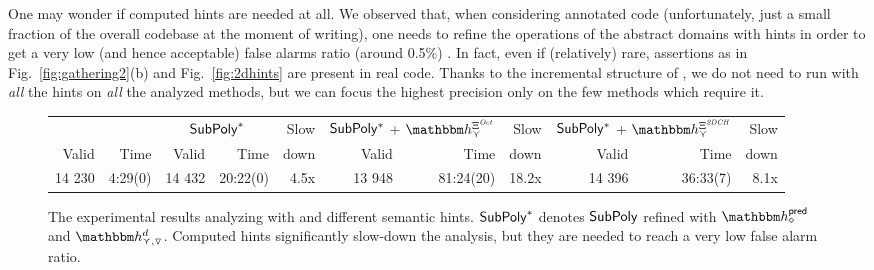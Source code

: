 \documentclass{llncs}
\newcommand{\sopra}{\vspace{-.3cm}}
\begin{document}
One may wonder if computed hints are needed at all.
We observed that, when considering annotated code (unfortunately, just a small fraction of the overall codebase at the moment of writing), one needs to refine the operations of the abstract domains with hints in order to get a very low (and hence acceptable) false alarms ratio (around 0.5\%) . 
In fact, even if (relatively) rare, assertions as in Fig.~\ref{fig:gathering2}(b) and Fig.~\ref{fig:2dhints} are present in real code.
Thanks to the incremental structure of \Clousot, we do not need to run \Subpoly{} with \emph{all} the hints on \emph{all} the analyzed methods, but we can focus the highest precision only on the few methods which require it.


\begin{figure}[t]
\centering
\small
\begin{tabular}{@{}r r | r r r| r r r | r r r@{}}
                        \multicolumn{2}{c|}{\Subpoly{}} & 
                        \multicolumn{2}{c}{$\mathsf{SubPoly}^*$}
                          & Slow &
                       \multicolumn{2}{c}{$\mathsf{SubPoly}{}^*$ + $ \hint{\cjoin}^{\hintcomp^\mathit{Oct}}$}
                          & Slow 
&  \multicolumn{2}{c}{$\mathsf{SubPoly}{}^*$ + $ \hint{\cjoin}^{\hintcomp^\mathit{2DCH}}$} & Slow
                           \\
Valid & Time & Valid & Time & down & Valid & Time & down  & Valid & Time & down  \\

\hline
 14 230 &  4:29(0) & 14 432 & 20:22(0)     &  4.5x & 13 948 & 81:24(20) & 18.2x & 14 396 & 36:33(7) & 8.1x
\end{tabular}
\caption{The experimental results analyzing   with \Subpoly{} and different semantic hints.
$\mathsf{SubPoly}^*$ denotes $\mathsf{SubPoly}$  refined with $\hint{\diamond}^{\mathsf{pred}}$   and  $\hint{\cjoin,\widening}^{d}$.
Computed hints significantly slow-down the analysis, but they are needed to reach a very low false alarm ratio.}
\label{tab:subpoly}
\sopra
\end{figure}


\sopra
\end{document}

